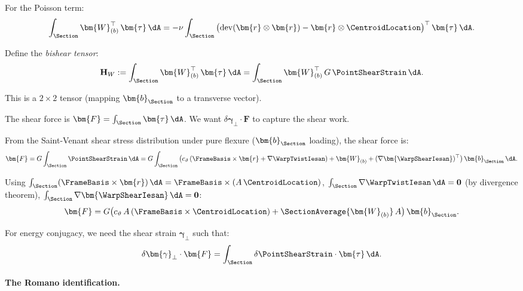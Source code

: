 For the Poisson term:
\begin{equation*}
\int_\Section \bm{W}_{(b)}^\top\,\bm{\tau} \, \dA 
= -\nu \int_\Section \big(\mathrm{dev}(\bm{r} \otimes \bm{r}) 
- \bm{r} \otimes \CentroidLocation\big)^\top\,\bm{\tau} \, \dA.
\end{equation*}

Define the \emph{bishear tensor}:
\begin{equation}
\mathbf{H}_W := \int_\Section \bm{W}_{(b)}^\top\,\bm{\tau} \, \dA 
= \int_\Section \bm{W}_{(b)}^\top\,G\,\PointShearStrain \, \dA.
\label{eq:def-bishear-W}
\end{equation}

This is a $2 \times 2$ tensor (mapping $\bm{b}_{\Section}$ to a transverse vector).

The shear force is $\bm{F} = \int_\Section \bm{\tau} \, \dA$. We want 
$\delta\bm{\gamma}_\perp \cdot \bm{F}$ to capture the shear work. 

From the Saint-Venant shear stress distribution under pure flexure 
($\bm{b}_{\Section}$ loading), the shear force is:
\begin{equation}
\bm{F} = G \int_\Section \PointShearStrain \, \dA 
= G \int_\Section \big( c_\vartheta\,(\FrameBasis \times \bm{r} + \nabla\WarpTwistIesan) 
+ \bm{W}_{(b)} + (\nabla\bm{\WarpShearIesan})^\top \big)\,\bm{b}_{\Section} \, \dA.
\end{equation}

Using $\int_\Section (\FrameBasis \times \bm{r}) \, \dA = \FrameBasis \times (A\,\CentroidLocation)$, 
$\int_\Section \nabla\WarpTwistIesan \, \dA = \mathbf{0}$ (by divergence theorem), 
$\int_\Section \nabla\bm{\WarpShearIesan} \, \dA = \mathbf{0}$:
\begin{equation}
\bm{F} = G \big( c_\vartheta\,A\,(\FrameBasis \times \CentroidLocation) 
+ \SectionAverage{\bm{W}_{(b)}}\,A \big)\,\bm{b}_{\Section}.
\end{equation}

For energy conjugacy, we need the shear strain $\bm{\gamma}_\perp$ such that:
\begin{equation}
\delta\bm{\gamma}_\perp \cdot \bm{F} = \int_\Section \delta\PointShearStrain \cdot \bm{\tau} \, \dA.
\label{eq:shear-conjugacy}
\end{equation}

\paragraph{The Romano identification.}

